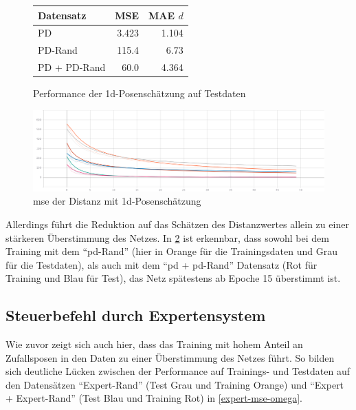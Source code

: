 \begin{figure}[H]
	\centering
	\begin{tabular}[t]{|l|r|r|}
		\hline
		Datensatz & MSE & MAE $d$ \\
		\hline
		PD & 3.423 & 1.104 \\
		\hline
		PD-Rand & 115.4 & 6.73 \\
		\hline
		PD + PD-Rand & 60.0 & 4.364 \\
		\hline
	\end{tabular}
	\caption{Performance der \acs{1d}-Posenschätzung auf Testdaten}
	\label{1d-pose-performance}
\end{figure}

\begin{figure}[H]
	\centering
	\includegraphics[width=\linewidth]{kapitel5/images/tensorboard/d-only/Loss-d-only.png}
	\caption{\acs{mse} der Distanz mit \acs{1d}-Posenschätzung}
	\label{1d-poses-mse-d}
\end{figure}

Allerdings führt die Reduktion auf das Schätzen des Distanzwertes allein zu einer stärkeren Überstimmung des Netzes. In \ref{1d-poses-mse-d} ist erkennbar, dass sowohl bei dem Training mit dem ``\acs{pd}-Rand'' (hier in Orange für die Trainingsdaten und Grau für die Testdaten), als auch mit dem ``\acs{pd} + \acs{pd}-Rand'' Datensatz (Rot für Training und Blau für Test), das Netz spätestens ab Epoche 15 überstimmt ist.

\subsection{Steuerbefehl durch Expertensystem}


Wie zuvor zeigt sich auch hier, dass das Training mit hohem Anteil an Zufallsposen in den Daten zu einer Überstimmung des Netzes führt. So bilden sich deutliche Lücken zwischen der Performance auf Trainings- und Testdaten auf den Datensätzen ``Expert-Rand'' (Test Grau und Training Orange) und ``Expert + Expert-Rand'' (Test Blau und Training Rot) in \ref{expert-mse-omega}.


